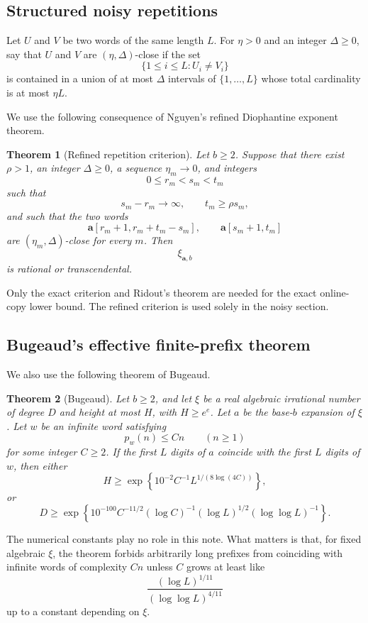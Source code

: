 \documentclass[11pt]{amsart}
\newtheorem{theorem}{Theorem}[section]
\theoremstyle{definition}
\begin{document}
\subsection{Structured noisy repetitions}

Let \(U\) and \(V\) be two words of the same length \(L\). For \(\eta>0\) and an integer \(\Delta\geq 0\), say that \(U\) and \(V\) are \((\eta,\Delta)\)-close if the set
\[
\{1\leq i\leq L: U_i\neq V_i\}
\]
is contained in a union of at most \(\Delta\) intervals of \(\{1,\ldots,L\}\) whose total cardinality is at most \(\eta L\).

We use the following consequence of Nguyen's refined Diophantine exponent theorem.

\begin{theorem}[Refined repetition criterion]
Let \(b\geq 2\). Suppose that there exist \(\rho>1\), an integer \(\Delta\geq 0\), a sequence \(\eta_m\to 0\), and integers
\[
0\leq r_m<s_m<t_m
\]
such that
\[
s_m-r_m\to\infty,
\qquad
t_m\geq \rho s_m,
\]
and such that the two words
\[
\mathbf a[r_m+1,r_m+t_m-s_m],
\qquad
\mathbf a[s_m+1,t_m]
\]
are \((\eta_m,\Delta)\)-close for every \(m\). Then
\[
\xi_{\mathbf a,b}
\]
is rational or transcendental.
\end{theorem}

Only the exact criterion and Ridout's theorem are needed for the exact online-copy lower bound. The refined criterion is used solely in the noisy section.

\subsection{Bugeaud's effective finite-prefix theorem}

We also use the following theorem of Bugeaud.

\begin{theorem}[Bugeaud]
Let \(b\geq 2\), and let \(\xi\) be a real algebraic irrational number of degree \(D\) and height at most \(H\), with \(H\geq e^e\). Let \(a\) be the base-\(b\) expansion of \(\xi\). Let \(w\) be an infinite word satisfying
\[
p_w(n)\leq Cn
\qquad(n\geq 1)
\]
for some integer \(C\geq 2\). If the first \(L\) digits of \(a\) coincide with the first \(L\) digits of \(w\), then either
\[
H
\geq
\exp\left\{
10^{-2}C^{-1}L^{1/(8\log(4C))}
\right\},
\]
or
\[
D
\geq
\exp\left\{
10^{-100}C^{-11/2}(\log C)^{-1}
(\log L)^{1/2}(\log\log L)^{-1}
\right\}.
\]
\end{theorem}

The numerical constants play no role in this note. What matters is that, for fixed algebraic \(\xi\), the theorem forbids arbitrarily long prefixes from coinciding with infinite words of complexity \(Cn\) unless \(C\) grows at least like
\[
\frac{(\log L)^{1/11}}{(\log\log L)^{4/11}}
\]
up to a constant depending on \(\xi\).
\end{document}

